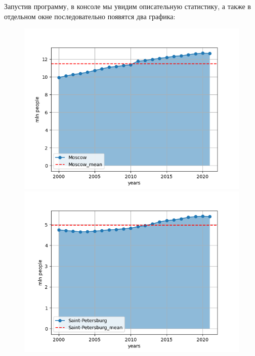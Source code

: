 Запустив программу, в консоле мы увидим описательную статистику, а также в отдельном окне последовательно появятся два графика:

\begin{figure}[H]
	\begin{center}
		\includegraphics[scale=0.5]{include/fig/Figure_1}
		\includegraphics[scale=0.5]{include/fig/Figure_2}
	\end{center}
\end{figure}

